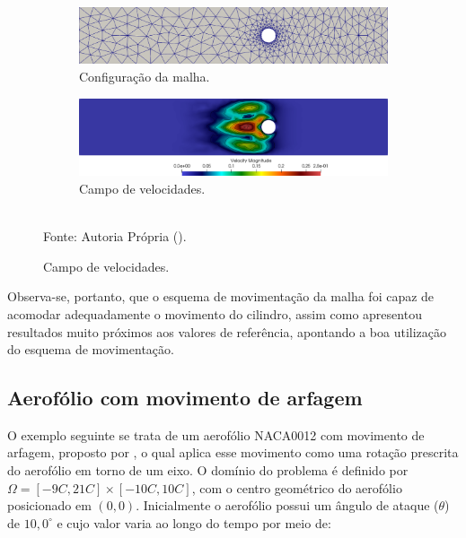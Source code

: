 \begin{figure}[h!]
    \centering
    \caption{Cilindro com deslocamento prescrito - Configuração da malha e campo de velocidades no instante $t=21,0$.}
    \begin{subfigure}{\linewidth}
        \centering
        \includegraphics[width=\linewidth]{Figuras/moving-cylinder/m21.png}
        \caption{Configuração da malha.}
    \end{subfigure}
    \begin{subfigure}{\linewidth}
        \centering
        \includegraphics[width=\linewidth]{Figuras/moving-cylinder/u21.png}
        \caption{Campo de velocidades.}
    \end{subfigure}
    \\Fonte: Autoria Própria (\the\year).
    \label{fig:moving-t-21}
\end{figure}

Observa-se, portanto, que o esquema de movimentação da malha foi capaz de acomodar adequadamente o movimento do cilindro, assim como apresentou resultados muito próximos aos valores de referência, apontando a boa utilização do esquema de movimentação.

\subsection{Aerofólio com movimento de arfagem}

O exemplo seguinte se trata de um aerofólio NACA0012 com movimento de arfagem, proposto por , o qual aplica esse movimento como uma rotação prescrita do aerofólio em torno de um eixo. O domínio do problema é definido por $\Omega=[-9C, 21C]\times[-10C, 10C]$, com o centro geométrico do aerofólio posicionado em $(0,0)$. Inicialmente o aerofólio possui um ângulo de ataque ($\theta$) de $10,0^\circ$ e cujo valor varia ao longo do tempo por meio de:

